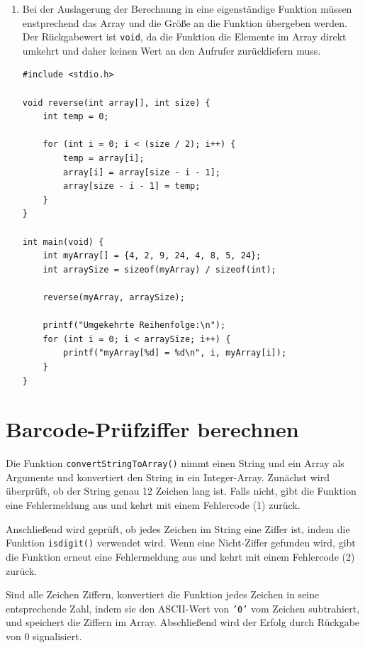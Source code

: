 \begin{enumerate}
\item Bei der Auslagerung der Berechnung in eine eigenständige Funktion müssen
enstprechend das Array und die Größe an die Funktion übergeben werden. Der
Rückgabewert ist \texttt{void}, da die Funktion die Elemente im Array
direkt umkehrt und daher keinen Wert an den Aufrufer zurückliefern muss.

\begin{verbatim}
#include <stdio.h>

void reverse(int array[], int size) {
    int temp = 0;

    for (int i = 0; i < (size / 2); i++) {
        temp = array[i];
        array[i] = array[size - i - 1];
        array[size - i - 1] = temp;
    }
}

int main(void) {
    int myArray[] = {4, 2, 9, 24, 4, 8, 5, 24};
    int arraySize = sizeof(myArray) / sizeof(int);

    reverse(myArray, arraySize);

    printf("Umgekehrte Reihenfolge:\n");
    for (int i = 0; i < arraySize; i++) {
        printf("myArray[%d] = %d\n", i, myArray[i]);
    }
}
\end{verbatim}

\end{enumerate}



\chapter{Barcode-Prüfziffer berechnen}

Die Funktion \texttt{convertStringToArray()} nimmt einen String und ein
Array als Argumente und konvertiert den String in ein Integer-Array. Zunächst
wird überprüft, ob der String genau 12 Zeichen lang ist. Falls nicht, gibt die
Funktion eine Fehlermeldung aus und kehrt mit einem Fehlercode (1) zurück.

Anschließend wird geprüft, ob jedes Zeichen im String eine Ziffer ist, indem die
Funktion \texttt{isdigit()} verwendet wird. Wenn eine Nicht-Ziffer
gefunden wird, gibt die Funktion erneut eine Fehlermeldung aus und kehrt mit
einem Fehlercode (2) zurück.

Sind alle Zeichen Ziffern, konvertiert die Funktion jedes Zeichen in seine
entsprechende Zahl, indem sie den ASCII-Wert von \texttt{'0'} vom Zeichen
subtrahiert, und speichert die Ziffern im Array. Abschließend wird der Erfolg
durch Rückgabe von 0 signalisiert.

